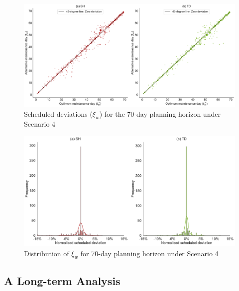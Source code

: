 \begin{figure}[htbp]
    \centering
    \includegraphics[width=\linewidth]{sched_dev_70.pdf}
    \caption{Scheduled deviations ($\xi_w$) for the 70-day planning horizon under Scenario 4}
    \label{fig:sched_deviation}
\end{figure}

\begin{figure}[htbp]
    \centering
    \includegraphics[width=\linewidth]{normalise_dev.pdf}
    \caption{Distribution of $\bar{\xi}_w$ for 70-day planning horizon  under Scenario 4}
    \label{fig:normalized_dev}
\end{figure}


\subsection{A Long-term Analysis}
\label{sec:long_termAna}

